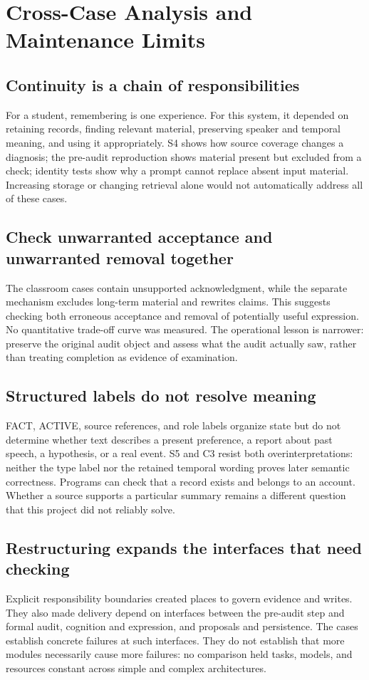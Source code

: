 \documentclass[11pt,a4paper]{article}
\begin{document}
\section{Cross-Case Analysis and Maintenance Limits}
\subsection{Continuity is a chain of responsibilities}
For a student, remembering is one experience. For this system, it depended on retaining records, finding relevant material, preserving speaker and temporal meaning, and using it appropriately. S4 shows how source coverage changes a diagnosis; the pre-audit reproduction shows material present but excluded from a check; identity tests show why a prompt cannot replace absent input material. Increasing storage or changing retrieval alone would not automatically address all of these cases.

\subsection{Check unwarranted acceptance and unwarranted removal together}
The classroom cases contain unsupported acknowledgment, while the separate mechanism excludes long-term material and rewrites claims. This suggests checking both erroneous acceptance and removal of potentially useful expression. No quantitative trade-off curve was measured. The operational lesson is narrower: preserve the original audit object and assess what the audit actually saw, rather than treating completion as evidence of examination.

\subsection{Structured labels do not resolve meaning}
FACT, ACTIVE, source references, and role labels organize state but do not determine whether text describes a present preference, a report about past speech, a hypothesis, or a real event. S5 and C3 resist both overinterpretations: neither the type label nor the retained temporal wording proves later semantic correctness. Programs can check that a record exists and belongs to an account. Whether a source supports a particular summary remains a different question that this project did not reliably solve.

\subsection{Restructuring expands the interfaces that need checking}
Explicit responsibility boundaries created places to govern evidence and writes. They also made delivery depend on interfaces between the pre-audit step and formal audit, cognition and expression, and proposals and persistence. The cases establish concrete failures at such interfaces. They do not establish that more modules necessarily cause more failures: no comparison held tasks, models, and resources constant across simple and complex architectures.
\end{document}
